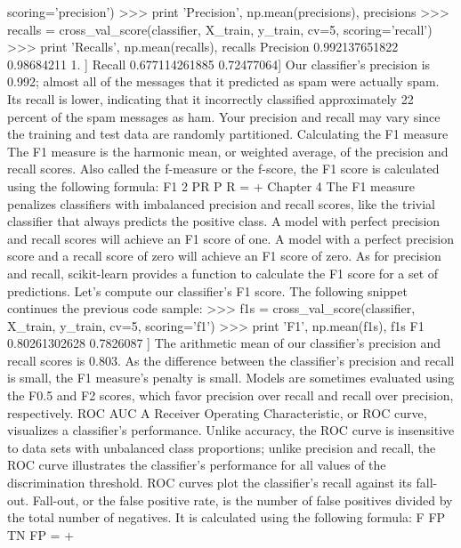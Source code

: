 \begin{frame}
\begin{frame}
\begin{frame}
\begin{frame}
\begin{frame}
\begin{frame}
\begin{frame}
\begin{frame}
scoring='precision')
>>> print 'Precision', np.mean(precisions), precisions
>>> recalls = cross_val_score(classifier, X_train, y_train, cv=5,
scoring='recall')
>>> print 'Recalls', np.mean(recalls), recalls
Precision 0.992137651822 %
0.98684211 1. ]
Recall 0.677114261885 %
0.72477064]
Our classifier's precision is 0.992; almost all of the messages that it predicted as
spam were actually spam. Its recall is lower, indicating that it incorrectly classified
approximately 22 percent of the spam messages as ham. Your precision and recall
may vary since the training and test data are randomly partitioned.
Calculating the F1 measure
The F1 measure is the harmonic mean, or weighted average, of the precision and
recall scores. Also called the f-measure or the f-score, the F1 score is calculated using
the following formula:
F1 2 PR
P R
=
+
Chapter 4
The F1 measure penalizes classifiers with imbalanced precision and recall scores,
like the trivial classifier that always predicts the positive class. A model with perfect
precision and recall scores will achieve an F1 score of one. A model with a perfect
precision score and a recall score of zero will achieve an F1 score of zero. As for
precision and recall, scikit-learn provides a function to calculate the F1 score for
a set of predictions. Let's compute our classifier's F1 score. The following snippet
continues the previous code sample:
>>> f1s = cross_val_score(classifier, X_train, y_train, cv=5,
scoring='f1')
>>> print 'F1', np.mean(f1s), f1s
F1 0.80261302628 %
0.7826087 ]
The arithmetic mean of our classifier's precision and recall scores is 0.803. As the
difference between the classifier's precision and recall is small, the F1 measure's
penalty is small. Models are sometimes evaluated using the F0.5 and F2 scores,
which favor precision over recall and recall over precision, respectively.
ROC AUC
A Receiver Operating Characteristic, or ROC curve, visualizes a classifier's
performance. Unlike accuracy, the ROC curve is insensitive to data sets with
unbalanced class proportions; unlike precision and recall, the ROC curve illustrates
the classifier's performance for all values of the discrimination threshold. ROC
curves plot the classifier's recall against its fall-out. Fall-out, or the false positive
rate, is the number of false positives divided by the total number of negatives. It is
calculated using the following formula:
F FP
TN FP
=
+

\end{frame}
\end{frame}
\end{frame}
\end{frame}
\end{frame}
\end{frame}
\end{frame}
\end{frame}
